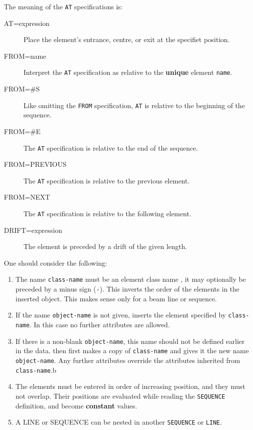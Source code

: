 The meaning of the \texttt{AT} specifications is:
\begin{description}
\item[AT=expression]
  Place the element's entrance, centre, or exit at the specifiet
  position.
\item[FROM=name]
  Interpret the \texttt{AT} specification as relative to the
  \textbf{unique} element \texttt{name}.
\item[FROM=\#S]
  Like omitting the \texttt{FROM} specification, \texttt{AT} is
  relative to the beginning of the sequence.
\item[FROM=\#E]
  The \texttt{AT} specification is relative to the end of the
  sequence.
\item[FROM=PREVIOUS]
  The \texttt{AT} specification is relative to the previous element.
\item[FROM=NEXT]
  The \texttt{AT} specification is relative to the following element.
\item[DRIFT=expression]
  The element is preceded by a drift of the given length.
\end{description}

One should consider the following:

\begin{enumerate}
\item The name \texttt{class-name} must be an element
  class name ,
  it may optionally be preceded by a minus sign (\texttt{-}).
  This  inverts the order of the elements in the inserted object.
  This makes sense only for a beam line or sequence.

\item If the name \texttt{object-name} is not given,
  \opal inserts the element specified by \texttt{class-name}.
  In this case no further attributes are allowed.

\item If there is a non-blank \texttt{object-name},
  this name should not be defined earlier in the data.
  \opal then first makes a copy of \texttt{class-name} and gives it
  the new name \texttt{object-name}.
  Any further attributes override the attributes inherited from
  \texttt{class-name}.b

\item The elements must be entered in order of increasing position,
  and they must not overlap.
  Their positions are evaluated while reading the \texttt{SEQUENCE}
  definition, and become \textbf{constant} values.

\item A {LINE}  or
  {SEQUENCE}  can be nested in another
  \texttt{SEQUENCE} or \texttt{LINE}.
\end{enumerate}

